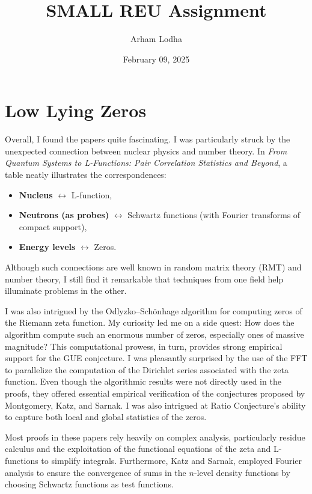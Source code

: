 \documentclass{article}
\begin{document}
\title{SMALL REU Assignment}
\author{Arham Lodha}%
\date{February 09, 2025}%
\maketitle


\section{Low Lying Zeros}

Overall, I found the papers quite fascinating. I was particularly struck by the unexpected connection between nuclear physics and number theory. In \emph{From Quantum Systems to L-Functions: Pair Correlation Statistics and Beyond}, a table neatly illustrates the correspondences:
\begin{itemize}
    \item \textbf{Nucleus} $\leftrightarrow$ L-function,
    \item \textbf{Neutrons (as probes)} $\leftrightarrow$ Schwartz functions (with Fourier transforms of compact support),
    \item \textbf{Energy levels} $\leftrightarrow$ Zeros.
\end{itemize}
Although such connections are well known in random matrix theory (RMT) and number theory, I still find it remarkable that techniques from one field help illuminate problems in the other.

I was also intrigued by the Odlyzko--Schönhage algorithm for computing zeros of the Riemann zeta function. My curiosity led me on a side quest: How does the algorithm compute such an enormous number of zeros, especially ones of massive magnitude? This computational prowess, in turn, provides strong empirical support for the GUE conjecture. I was pleasantly surprised by the use of the FFT to parallelize the computation of the Dirichlet series associated with the zeta function. Even though the algorithmic results were not directly used in the proofs, they offered essential empirical verification of the conjectures proposed by Montgomery, Katz, and Sarnak. I was also intrigued at Ratio Conjecture's ability to capture both local and global statistics of the zeros.

Most proofs in these papers rely heavily on complex analysis, particularly residue calculus and the exploitation of the functional equations of the zeta and L-functions to simplify integrals. Furthermore, Katz and Sarnak, employed Fourier analysis to ensure the convergence of sums in the $n$-level density functions by choosing Schwartz functions as test functions. 
\end{document}
